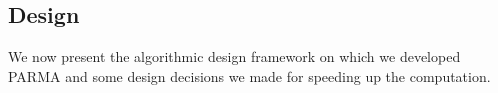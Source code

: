 
\subsection{Design}\label{subsec:design}
We now present the algorithmic design framework on which we developed PARMA and some design
decisions we made for speeding up the computation. 

